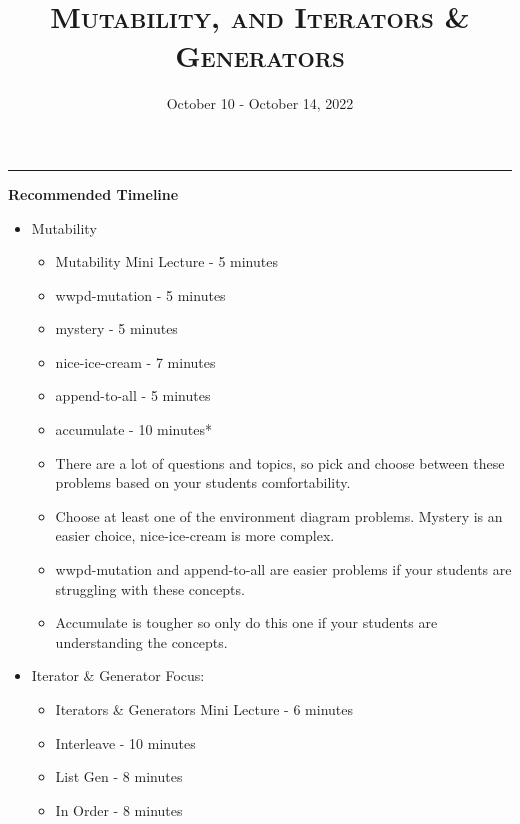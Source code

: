 \documentclass{exam}
\title{\textsc{Mutability, and Iterators \& Generators}}
\date{October 10 - October 14, 2022}
\begin{document}
\maketitle
\rule{\textwidth}{0.15em}
\fontsize{12}{15}\selectfont


\begin{guide}
    \newline
    \textbf{Recommended Timeline}
    \begin{itemize}
        \item Mutability
        \begin{itemize}
            \item Mutability Mini Lecture - 5 minutes
            \item wwpd-mutation - 5 minutes
            \item mystery - 5 minutes
            \item nice-ice-cream - 7 minutes
            \item append-to-all - 5 minutes
            \item accumulate - 10 minutes*
            \item There are a lot of questions and topics, so pick and choose between these problems based on your students comfortability.
            \item Choose at least one of the environment diagram problems. Mystery is an easier choice, nice-ice-cream is more complex.
            \item wwpd-mutation and append-to-all are easier problems if your students are struggling with these concepts.
            \item Accumulate is tougher so only do this one if your students are understanding the concepts.
        \end{itemize}
        \item Iterator \& Generator Focus:
        \begin{itemize}
            \item Iterators \& Generators Mini Lecture - 6 minutes
            \item Interleave - 10 minutes
            \item List Gen - 8 minutes
            \item In Order - 8 minutes
        \end{itemize}
    \end{itemize}
\end{guide}
\end{document}
